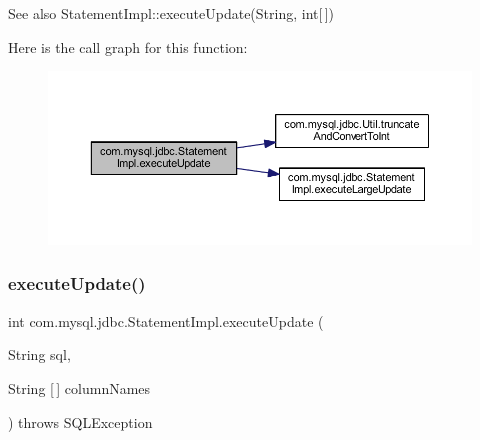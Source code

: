 \begin{DoxySeeAlso}{See also}
Statement\+Impl\+::execute\+Update(\+String, int\mbox{[}$\,$\mbox{]}) 
\end{DoxySeeAlso}
Here is the call graph for this function\+:
\nopagebreak
\begin{figure}[H]
\begin{center}
\leavevmode
\includegraphics[width=350pt]{classcom_1_1mysql_1_1jdbc_1_1_statement_impl_a9ec4107597d72e74f9c21a05108d73b0_cgraph}
\end{center}
\end{figure}
\mbox{\label{classcom_1_1mysql_1_1jdbc_1_1_statement_impl_af3e2e09209cea46435afa83318cceced}} 
\subsubsection{\texorpdfstring{execute\+Update()}{executeUpdate()}\hspace{0.1cm}{\footnotesize\ttfamily [4/4]}}
{\footnotesize\ttfamily int com.\+mysql.\+jdbc.\+Statement\+Impl.\+execute\+Update (\begin{DoxyParamCaption}\item[{String}]{sql,  }\item[{String \mbox{[}$\,$\mbox{]}}]{column\+Names }\end{DoxyParamCaption}) throws S\+Q\+L\+Exception}

